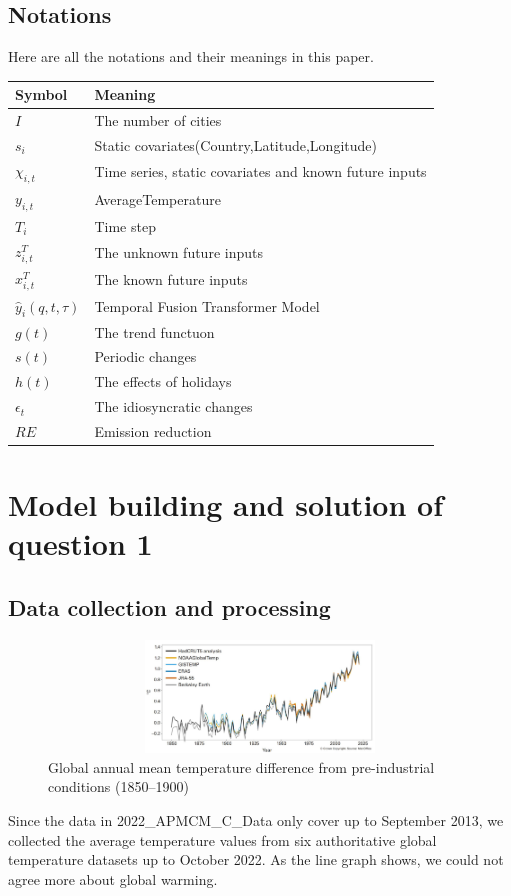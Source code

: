 \documentclass{apmcmthesis}
\begin{document}
\subsection{Notations}
Here are all the notations and their meanings in this paper.
\begin{table}[h]
	\centering
	\vspace{3pt}
	\begin{tabular}{>{\centering\arraybackslash}p{5em}>{\centering\arraybackslash}p{30em}}
	\toprule %
	Symbol & Meaning \\ \midrule
	$I$ & The number of cities \\
	$s_i$ & Static covariates(Country,Latitude,Longitude)\\
	$\chi_{i, t}$ & Time series, static covariates and known future inputs\\
	$y_{i, t}$ & AverageTemperature\\
	$T_i$ & Time step \\ 
	${z}_{i, t}^T$ & The unknown future inputs \\
	${x}_{i, t}^T$ & The known future inputs \\ 
	$\hat{y}_i(q, t, \tau)$ & Temporal Fusion Transformer Model \\
	$g(t)$ & The trend functuon  \\
	$s(t)$ & Periodic changes \\
	$h(t)$ & The effects of holidays \\
	$\epsilon_t$ & The idiosyncratic changes \\
        $RE$ & Emission reduction \\
	\bottomrule
	\end{tabular}
\end{table}
\section{Model building and solution of question 1}
\subsection{Data collection and processing}
\begin{figure}[!hb]
    \centering
    \includegraphics[width=13cm,height=3cm]{APMCMThesis/figures/six.jpg}
    \caption{Global annual
mean temperature
difference from
pre-industrial conditions
(1850–1900)\cite{bib:two}}
\label{fig1}
\end{figure}
Since the data in 2022\_APMCM\_C\_Data only cover up to September 2013, we collected the average temperature values  from six authoritative global temperature datasets up to October 2022. As the line graph\cite{fig1} shows, we could not agree more about global warming.
\end{document}
